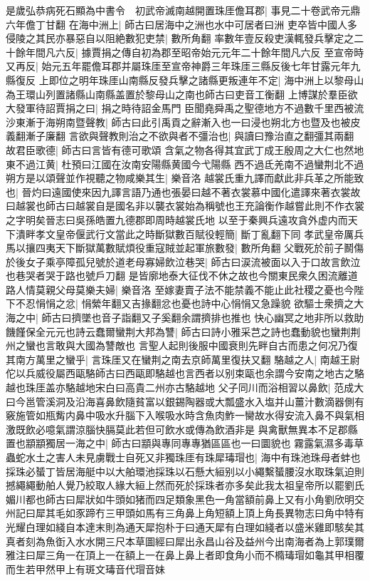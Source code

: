 是歲弘恭病死石顯為中書令　初武帝滅南越開置珠厓儋耳郡|{
	事見二十卷武帝元鼎六年儋丁甘翻}
在海中洲上|{
	師古曰居海中之洲也水中可居者曰洲}
吏卒皆中國人多侵陵之其民亦暴惡自以阻絶數犯吏禁|{
	數所角翻}
率數年壹反殺吏漢輒發兵擊定之二十餘年間凡六反|{
	據賈捐之傳自初為郡至昭帝始元元年二十餘年間凡六反}
至宣帝時又再反|{
	始元五年罷儋耳郡并屬珠厓至宣帝神爵三年珠厓三縣反後七年甘露元年九縣復反}
上即位之明年珠厓山南縣反發兵擊之諸縣更叛連年不定|{
	海中洲上以黎母山為王環山列置諸縣山南縣盖置於黎母山之南也師古曰吏音工衡翻}
上博謀於羣臣欲大發軍待詔賈捐之曰|{
	捐之時待詔金馬門}
臣聞堯舜禹之聖德地方不過數千里西被流沙東漸于海朔南暨聲教|{
	師古曰此引禹貢之辭漸入也一曰浸也朔北方也暨及也被皮義翻漸子廉翻}
言欲與聲教則治之不欲與者不彊治也|{
	與讀曰豫治直之翻彊其兩翻}
故君臣歌德|{
	師古曰言皆有德可歌頌}
含氣之物各得其宜武丁成王殷周之大仁也然地東不過江黄|{
	杜預曰江國在汝南安陽縣黄國今弋陽縣}
西不過氐羌南不過蠻荆北不過朔方是以頌聲並作視聽之物咸樂其生|{
	樂音洛}
越裳氏重九譯而獻此非兵革之所能致也|{
	晉灼曰遠國使來因九譯言語乃通也張晏曰越不著衣裳慕中國化遣譯來著衣裳故曰越裳也師古曰越裳自是國名非以襲衣裳始為稱號也王充論衡作越嘗此則不作衣裳之字明矣晉志曰吳孫皓置九德郡即周時越裳氏地}
以至于秦興兵遠攻貪外虚内而天下潰畔孝文皇帝偃武行文當此之時斷獄數百賦役輕簡|{
	斷丁亂翻下同}
孝武皇帝厲兵馬以攘四夷天下斷獄萬數賦煩役重寇賊並起軍旅數發|{
	數所角翻}
父戰死於前子鬭傷於後女子乘亭障孤兒號於道老母寡婦飲泣巷哭|{
	師古曰涙流被面以入于口故言飲泣也巷哭者哭于路也號戶刀翻}
是皆廓地泰大征伐不休之故也今關東民衆久困流離道路人情莫親父母莫樂夫婦|{
	樂音洛}
至嫁妻賣子法不能禁義不能止此社稷之憂也今陛下不忍悁悁之忿|{
	悁縈年翻又吉掾翻忿也憂也詩中心悁悁又急躁貌}
欲驅士衆擠之大海之中|{
	師古曰擠墜也音子詣翻又子奚翻余謂擠排也推也}
快心幽冥之地非所以救助饑饉保全元元也詩云蠢爾蠻荆大邦為讐|{
	師古曰詩小雅采芑之詩也蠢動貌也蠻荆荆州之蠻也言敢與大國為讐敵也}
言聖人起則後服中國衰則先畔自古而患之何况乃復其南方萬里之蠻乎|{
	言珠厓又在蠻荆之南去京師萬里復扶又翻}
駱越之人|{
	南越王尉佗以兵威役屬西甌駱師古曰西甌即駱越也言西者以别束甌也余謂今安南之地古之駱越也珠厓盖亦駱越地宋白曰高貴二州亦古駱越地}
父子同川而浴相習以鼻飲|{
	范成大曰今邕管溪洞及沿海喜鼻飲隨貧富以銀錫陶器或大瓢盛水入塩并山薑汁數滴器側有竅施管如瓶觜内鼻中吸水升腦下入喉吸水時含魚肉鮓一臠故水得安流入鼻不與氣相激既飲必噫氣謂涼腦快膈莫此若但可飲水或傳為飲酒非是}
與禽獸無異本不足郡縣置也顓顓獨居一海之中|{
	師古曰顓與專同專專猶區區也一曰圜貌也}
霧露氣濕多毒草蟲蛇水土之害人未見虜戰士自死又非獨珠厓有珠犀瑇瑁也|{
	海中有珠池珠母者蚌也採珠必蜑丁皆居海艇中以大舶環池採珠以石懸大絙别以小繩繫蜑腰沒水取珠氣迫則撼繩繩動舶人覺乃絞取人緣大絙上然而死於採珠者亦多矣此我太祖皇帝所以罷劉氏媚川都也師古曰犀狀如牛頭如猪而四足類象黑色一角當額前鼻上又有小角劉欣明交州記曰犀其毛如豕蹄冇三甲頭如馬有三角鼻上角短額上頂上角長異物志曰角中特有光耀白理如綫自本達末則為通天犀抱朴于曰通天犀有白理如綫者以盛米雞即駭矣其真者刻為魚衘入水水開三尺本草圖經曰犀出永昌山谷及益州今出南海者為上郭璞爾雅注曰犀三角一在頂上一在額上一在鼻上鼻上者即食角小而不橢瑇瑁如龜其甲相覆而生若甲然甲上有斑文瑇音代瑁音妹}
